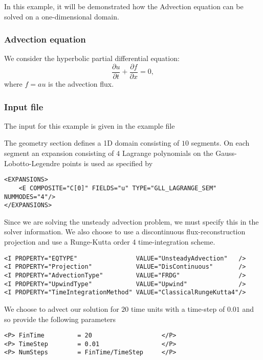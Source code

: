 In this example, it will be demonstrated how the Advection equation can be
solved on a one-dimensional domain.

\subsubsection{Advection equation}
We consider the hyperbolic partial differential equation:
\begin{equation}
\dfrac{\partial u}{\partial t} + \dfrac{\partial f}{\partial x} = 0,
\end{equation}
where $f =  a u$ is the advection flux.

\subsubsection{Input file}
The input for this example is given in the example file 

The geometry section defines a 1D domain consisting of $10$ segments. On each
segment an expansion consisting of $4$ Lagrange polynomials on the
Gauss-Lobotto-Legendre points is used as specified by
\begin{lstlisting}[style=XMLStyle]
<EXPANSIONS>
    <E COMPOSITE="C[0]" FIELDS="u" TYPE="GLL_LAGRANGE_SEM" NUMMODES="4"/>
</EXPANSIONS>
\end{lstlisting}

Since we are solving the unsteady advection problem, we must specify this in the
solver information. We also choose to use a discontinuous flux-reconstruction
projection and use a Runge-Kutta order 4 time-integration scheme.
\begin{lstlisting}[style=XMLStyle]
<I PROPERTY="EQTYPE"                VALUE="UnsteadyAdvection"   />
<I PROPERTY="Projection"            VALUE="DisContinuous"       />
<I PROPERTY="AdvectionType"         VALUE="FRDG"                />
<I PROPERTY="UpwindType"            VALUE="Upwind"              />
<I PROPERTY="TimeIntegrationMethod" VALUE="ClassicalRungeKutta4"/>
\end{lstlisting}

We choose to advect our solution for $20$ time units with a time-step of $0.01$
and so provide the following parameters
\begin{lstlisting}[style=XMLStyle]
<P> FinTime         = 20                   </P>
<P> TimeStep        = 0.01                 </P>
<P> NumSteps        = FinTime/TimeStep     </P>
\end{lstlisting}

